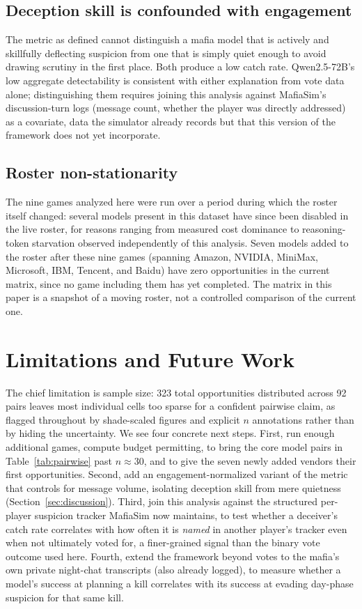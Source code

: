 \documentclass{article}
\begin{document}
\subsection{Deception skill is confounded with engagement}

The metric as defined cannot distinguish a mafia model that is actively and skillfully deflecting suspicion from one that is simply quiet enough to avoid drawing scrutiny in the first place. Both produce a low catch rate. Qwen2.5-72B's low aggregate detectability is consistent with either explanation from vote data alone; distinguishing them requires joining this analysis against MafiaSim's discussion-turn logs (message count, whether the player was directly addressed) as a covariate, data the simulator already records but that this version of the framework does not yet incorporate.

\subsection{Roster non-stationarity}
\label{sec:discussion-roster}

The nine games analyzed here were run over a period during which the roster itself changed: several models present in this dataset have since been disabled in the live roster, for reasons ranging from measured cost dominance to reasoning-token starvation observed independently of this analysis. Seven models added to the roster after these nine games (spanning Amazon, NVIDIA, MiniMax, Microsoft, IBM, Tencent, and Baidu) have zero opportunities in the current matrix, since no game including them has yet completed. The matrix in this paper is a snapshot of a moving roster, not a controlled comparison of the current one.

\section{Limitations and Future Work}
\label{sec:limitations}

The chief limitation is sample size: 323 total opportunities distributed across 92 pairs leaves most individual cells too sparse for a confident pairwise claim, as flagged throughout by shade-scaled figures and explicit $n$ annotations rather than by hiding the uncertainty. We see four concrete next steps. First, run enough additional games, compute budget permitting, to bring the core model pairs in Table~\ref{tab:pairwise} past $n{\approx}30$, and to give the seven newly added vendors their first opportunities. Second, add an engagement-normalized variant of the metric that controls for message volume, isolating deception skill from mere quietness (Section~\ref{sec:discussion}). Third, join this analysis against the structured per-player suspicion tracker MafiaSim now maintains, to test whether a deceiver's catch rate correlates with how often it is \textit{named} in another player's tracker even when not ultimately voted for, a finer-grained signal than the binary vote outcome used here. Fourth, extend the framework beyond votes to the mafia's own private night-chat transcripts (also already logged), to measure whether a model's success at planning a kill correlates with its success at evading day-phase suspicion for that same kill.
\end{document}
